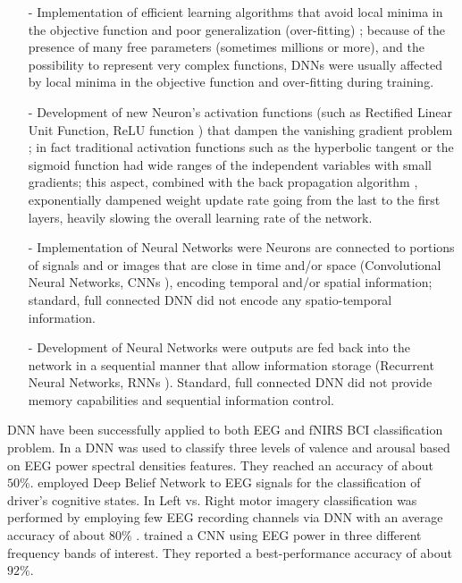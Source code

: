 \documentclass[12pt ]{iopart}
\begin{document}
\begin{itemize}
	\item[-] Implementation of efficient learning algorithms that avoid local minima in the objective function and poor generalization (over-fitting) \parencite{kingma2014adam} ; because of the presence of many free parameters (sometimes millions or more), and the possibility to represent very complex functions, DNNs were usually affected by local minima in the objective function and over-fitting  during training. 
	\item[-] Development of new Neuron's activation functions (such as Rectified Linear Unit Function, ReLU function \parencite{dahl2013improving, maas2013rectifier}) that dampen  the vanishing gradient problem \parencite{pascanu2013difficulty}; in fact traditional activation functions such as the hyperbolic tangent or the sigmoid function had wide ranges of the independent variables with small gradients;  this aspect, combined with the back propagation algorithm \parencite{hecht1988theory}, exponentially dampened weight update rate going from the last to the first layers, heavily slowing the overall learning rate of the network.
	\item[-] Implementation of  Neural Networks were Neurons are connected to portions of signals and or images that are close in time and/or space (Convolutional Neural Networks, CNNs \parencite{krizhevsky2012imagenet, kalchbrenner2014convolutional}), encoding temporal and/or spatial information; standard, full connected DNN  did not encode any spatio-temporal information.
	\item[-] Development of  Neural Networks were outputs are fed back into the network in a sequential manner that allow information storage (Recurrent Neural Networks, RNNs \parencite{mikolov2010recurrent, hochreiter1997long}). Standard, full connected DNN  did not provide memory capabilities and sequential information control.
\end{itemize}

DNN have been successfully applied to  both EEG and fNIRS BCI classification problem. In \textcite{jirayucharoensak2014eeg} a DNN was used to classify three levels of valence and arousal based on EEG power spectral densities  features. They reached an accuracy of about $50\%$. 
\textcite{hajinoroozi2015feature} employed Deep Belief Network to EEG signals for the classification of driver's cognitive states. 
In \textcite{an2014deep} Left vs. Right motor imagery classification  was performed by employing few EEG recording channels via DNN with an average accuracy of about $80\%$ . 
 \textcite{bashivan2015learning} trained a CNN using EEG power in three different frequency bands of interest. They reported a best-performance accuracy of about $92\%$.
\end{document}
